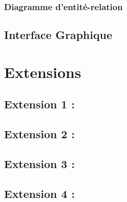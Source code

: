 \documentclass{article}
\begin{document}
		\subsubsection{Diagramme d'entité-relation}
			
			
	
		\subsection{Interface Graphique}
						

\section{Extensions}
	
	\subsection{Extension 1 : }
	
	\subsection{Extension 2 : }
	
	\subsection{Extension 3 : }
	
	\subsection{Extension 4 : }
	
	
		
\end{document}
